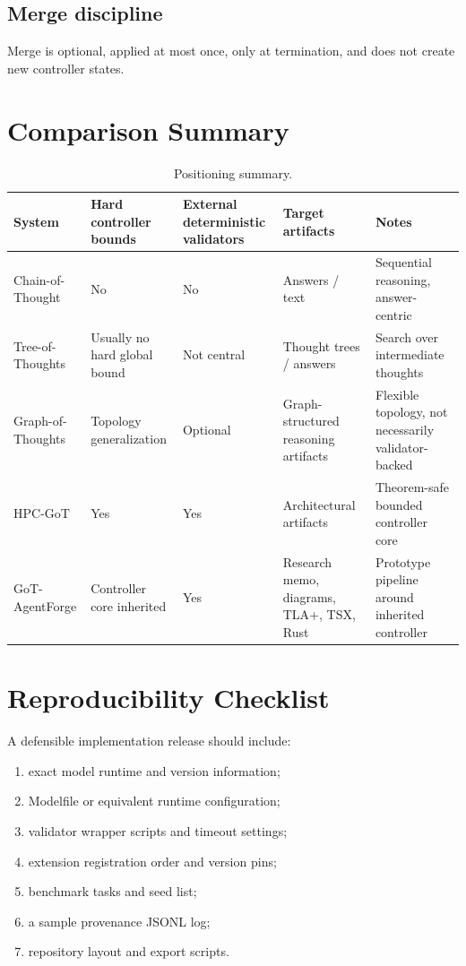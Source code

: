 \documentclass[11pt,a4paper,oneside]{article}
\begin{document}
\subsection{Merge discipline}
Merge is optional, applied at most once, only at termination, and does not create new controller states.

\section{Comparison Summary}
\begin{table}[H]
\centering
\caption{Positioning summary.}
\begin{tabularx}{\linewidth}{>{\raggedright\arraybackslash}p{3.2cm} >{\raggedright\arraybackslash}p{2cm} >{\raggedright\arraybackslash}p{2.1cm} >{\raggedright\arraybackslash}p{2.5cm} X}
\toprule
System & Hard controller bounds & External deterministic validators & Target artifacts & Notes \\
\midrule
Chain-of-Thought & No & No & Answers / text & Sequential reasoning, answer-centric \\
Tree-of-Thoughts & Usually no hard global bound & Not central & Thought trees / answers & Search over intermediate thoughts \\
Graph-of-Thoughts & Topology generalization & Optional & Graph-structured reasoning artifacts & Flexible topology, not necessarily validator-backed \\
HPC-GoT & Yes & Yes & Architectural artifacts & Theorem-safe bounded controller core \\
GoT-AgentForge & Controller core inherited & Yes & Research memo, diagrams, TLA+, TSX, Rust & Prototype pipeline around inherited controller \\
\bottomrule
\end{tabularx}
\end{table}

\section{Reproducibility Checklist}
A defensible implementation release should include:
\begin{enumerate}[leftmargin=2em]
    \item exact model runtime and version information;
    \item Modelfile or equivalent runtime configuration;
    \item validator wrapper scripts and timeout settings;
    \item extension registration order and version pins;
    \item benchmark tasks and seed list;
    \item a sample provenance JSONL log;
    \item repository layout and export scripts.
\end{enumerate}
\end{document}
